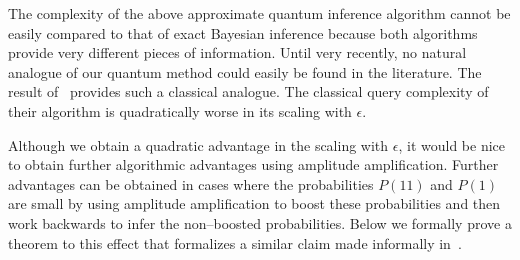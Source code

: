 \documentclass[aps,amsmath,onecolumn,amssymb,notitlepage]{revtex4-1}
\begin{document}
The complexity of the above approximate quantum inference algorithm cannot be easily compared to that of exact Bayesian inference because both algorithms
provide very different pieces of information.  Until very recently,
no natural analogue of our quantum method could easily be found in the literature.  The result of~\cite{wiebe2015bayesian} provides such a classical analogue.  The classical query complexity of their algorithm is quadratically worse in its scaling with $\epsilon$.

Although we obtain a quadratic advantage in the scaling with $\epsilon$, it would be nice to obtain further algorithmic advantages using amplitude amplification.  Further advantages can be obtained in cases where the probabilities $P(11)$ and $P(1)$ are small by using amplitude amplification to boost these probabilities and then work backwards to infer the non--boosted probabilities.  Below we formally prove a theorem to this effect that formalizes a similar claim made informally in~\cite{WHW15}.
\end{document}
